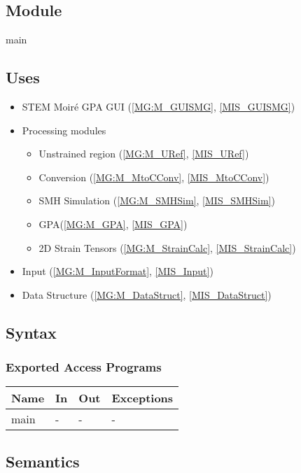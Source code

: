 \documentclass[12pt, titlepage]{article}
\begin{document}
\subsection{Module}
main
\subsection{Uses}
\begin{itemize}
\item STEM Moir{\'e} GPA GUI (\cref{MG:M_GUISMG}, \cref{MIS_GUISMG})
\item Processing modules \begin{itemize}
	\item Unstrained region (\cref{MG:M_URef}, \cref{MIS_URef})
	\item Conversion (\cref{MG:M_MtoCConv}, \cref{MIS_MtoCConv})
	\item SMH Simulation (\cref{MG:M_SMHSim}, \cref{MIS_SMHSim})
	\item GPA(\cref{MG:M_GPA}, \cref{MIS_GPA})
	\item 2D Strain Tensors (\cref{MG:M_StrainCalc}, \cref{MIS_StrainCalc})
\end{itemize}
\item Input (\cref{MG:M_InputFormat}, \cref{MIS_Input})
\item Data Structure (\cref{MG:M_DataStruct}, \cref{MIS_DataStruct})
\end{itemize}

\subsection{Syntax}

\subsubsection{Exported Access Programs}

\begin{center}
\begin{tabular}{p{2cm} p{3cm} p{3cm} p{3cm}}
\hline
\textbf{Name} & \textbf{In} & \textbf{Out} & \textbf{Exceptions} \\
\hline
main & - & - & - \\
\hline
\end{tabular}
\end{center}

\subsection{Semantics}
\end{document}
